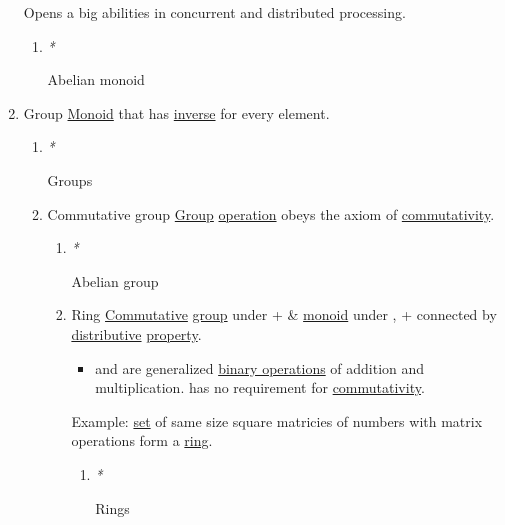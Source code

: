 \documentclass[11pt]{article}
\begin{document}
\begin{enumerate}
Opens a big abilities in concurrent and distributed processing.\\

\begin{enumerate}
\item \emph{*}
\label{sec:org81f1860}

\label{orgcb93f93}Abelian monoid\\
\end{enumerate}

\item \label{org9ef38ed}Group
\label{sec:orgfe55b97}
\hyperref[org8ff50ea]{Monoid} that has \hyperref[org41275e7]{inverse} for every element.\\

\begin{enumerate}
\item \emph{*}
\label{sec:org59f8269}

\label{org7292335}Groups\\

\item \label{org177a31d}Commutative group
\label{sec:org09b74cb}
\hyperref[org9ef38ed]{Group} \hyperref[org87d485b]{operation} obeys the axiom of \hyperref[orgcdabb90]{commutativity}.\\

\begin{enumerate}
\item \emph{*}
\label{sec:org7f2f205}

\label{org079b4e5}Abelian group\\

\item \label{org3db5758}Ring
\label{sec:org0dcdd29}
\hyperref[orgcb2a02d]{Commutative} \hyperref[org9ef38ed]{group} under + \& \hyperref[org8ff50ea]{monoid} under \texttimes{}, + \texttimes{} connected by \hyperref[org49b5544]{distributive} \hyperref[org07ca26b]{property}.\\

\begin{itemize}
\item and \texttimes{} are generalized \hyperref[org3ca7d32]{binary operations} of addition and multiplication. \texttimes{} has no requirement for \hyperref[orgcdabb90]{commutativity}.\\
\end{itemize}

Example: \hyperref[orgbed80ba]{set} of same size square matricies of numbers with matrix operations form a \hyperref[org3db5758]{ring}.\\

\begin{enumerate}
\item \emph{*}
\label{sec:org82cb0f4}

\label{org4c726bc}Rings\\
\end{enumerate}
\end{enumerate}
\end{enumerate}
\end{enumerate}
\end{document}
